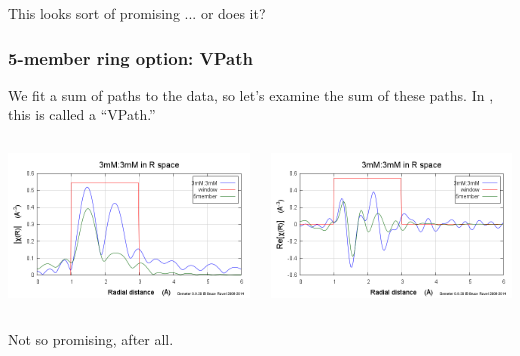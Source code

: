 \documentclass[10pt, xcolor=x11names, compress]{beamer}
\begin{document}
\begin{frame}
  \bigskip

  \begin{exampleblock}{}
    \centering This looks sort of promising ... or does it?
  \end{exampleblock}

\end{frame}

\begin{frame}
  \frametitle{5-member ring option: VPath}

  We fit a \alert{sum of paths} to the data, so let's examine the sum
  of these paths.  In {\artemis}, this is called a ``VPath.''

  \bigskip

  \begin{columns}
    \begin{column}{0.5\linewidth}
      \includegraphics[width=\linewidth]{images/5member_chirmag.png}
    \end{column}
    \begin{column}{0.5\linewidth}
      \includegraphics[width=\linewidth]{images/5member_chirre.png}
    \end{column}
  \end{columns}
  
  \bigskip

  \begin{alertblock}{}
    \centering Not so promising, after all.
  \end{alertblock}

\end{frame}
\end{document}
